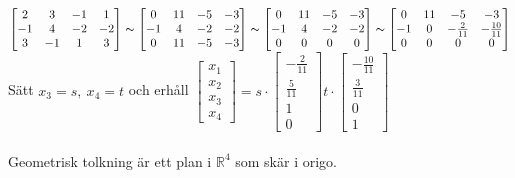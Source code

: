 $\begin{bmatrix}
2&3&-1&1\\
-1&4&-2&-2\\
3&-1&1&3
\end{bmatrix}\thicksim
\begin{bmatrix}
0&11&-5&-3\\
-1&4&-2&-2\\
0&11&-5&-3
\end{bmatrix}\thicksim
\begin{bmatrix}
0&11&-5&-3\\
-1&4&-2&-2\\
0&0&0&0
\end{bmatrix}\thicksim
\begin{bmatrix}
0&11&-5&-3\\
-1&0&-\frac{2}{11}&-\frac{10}{11}\\
0&0&0&0
\end{bmatrix}
$\\
Sätt $x_3=s,\ x_4=t$ och erhåll $\begin{bmatrix}x_1\\x_2\\x_3\\x_4\end{bmatrix}=s\cdot\begin{bmatrix}-\frac{2}{11}\\\frac{5}{11}\\1\\0\end{bmatrix}t\cdot\begin{bmatrix}-\frac{10}{11}\\\frac{3}{11}\\0\\1\end{bmatrix}$
\\\\
Geometrisk tolkning är ett plan i $\mathbb{R}^4$ som skär i origo.